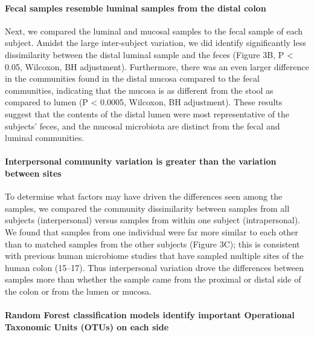 \documentclass[12pt,]{article}
\let\oldparagraph\paragraph
\renewcommand{\paragraph}[1]{\oldparagraph{#1}\mbox{}}
\begin{document}
\paragraph{Fecal samples resemble luminal samples from the distal
colon}\label{fecal-samples-resemble-luminal-samples-from-the-distal-colon}

Next, we compared the luminal and mucosal samples to the fecal sample of
each subject. Amidst the large inter-subject variation, we did identify
significantly less dissimilarity between the distal luminal sample and
the feces (Figure 3B, P \textless{} 0.05, Wilcoxon, BH adjustment).
Furthermore, there was an even larger difference in the communities
found in the distal mucosa compared to the fecal communities, indicating
that the mucosa is as different from the stool as compared to lumen (P
\textless{} 0.0005, Wilcoxon, BH adjustment). These results suggest that
the contents of the distal lumen were most representative of the
subjects' feces, and the mucosal microbiota are distinct from the fecal
and luminal communities.

\paragraph{Interpersonal community variation is greater than the
variation between
sites}\label{interpersonal-community-variation-is-greater-than-the-variation-between-sites}

To determine what factors may have driven the differences seen among the
samples, we compared the community dissimilarity between samples from
all subjects (interpersonal) versus samples from within one subject
(intrapersonal). We found that samples from one individual were far more
similar to each other than to matched samples from the other subjects
(Figure 3C); this is consistent with previous human microbiome studies
that have sampled multiple sites of the human colon (15--17). Thus
interpersonal variation drove the differences between samples more than
whether the sample came from the proximal or distal side of the colon or
from the lumen or mucosa.

\paragraph{Random Forest classification models identify important
Operational Taxonomic Units (OTUs) on each
side}\label{random-forest-classification-models-identify-important-operational-taxonomic-units-otus-on-each-side}
\end{document}
